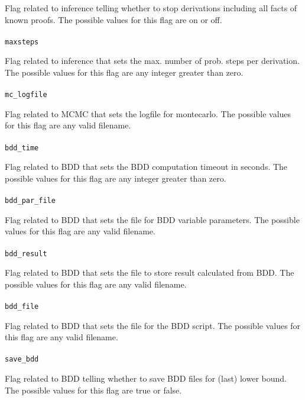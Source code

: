 \documentclass[a4paper,12pt]{article}
\begin{document}
Flag related to inference telling whether to stop derivations including all facts of known proofs.
The possible values for this flag are on or off.
\paragraph{}
\texttt{maxsteps}

Flag related to inference that sets the max. number of prob. steps per derivation.
The possible values for this flag are any integer greater than zero.
\paragraph{}
\texttt{mc\_logfile}

Flag related to MCMC that sets the logfile for montecarlo.
The possible values for this flag are any valid filename.
\paragraph{}
\texttt{bdd\_time}

Flag related to BDD that sets the BDD computation timeout in seconds.
The possible values for this flag are any integer greater than zero.
\paragraph{}
\texttt{bdd\_par\_file}

Flag related to BDD that sets the file for BDD variable parameters.
The possible values for this flag are any valid filename.
\paragraph{}
\texttt{bdd\_result}

Flag related to BDD that sets the file to store result calculated from BDD.
The possible values for this flag are any valid filename.
\paragraph{}
\texttt{bdd\_file}

Flag related to BDD that sets the file for the BDD script.
The possible values for this flag are any valid filename.
\paragraph{}
\texttt{save\_bdd}

Flag related to BDD telling whether to save BDD files for (last) lower bound.
The possible values for this flag are true or false.
\end{document}
